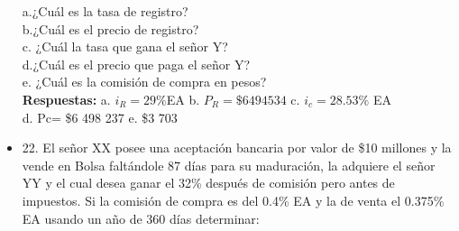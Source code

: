 \begin{itemize}
	a.¿Cuál es la tasa de registro?\\
	b.¿Cuál es el precio de registro?\\
	c. ¿Cuál la tasa que gana el señor Y?\\
	d.¿Cuál es el precio que paga el señor Y?\\
	e. ¿Cuál es la comisión de compra en pesos?\\
	\textbf{Respuestas:} a. $i_{R}= 29\%$EA\hspace{0,5cm} b. $P_{R} = \$6 494 534$\hspace{0,5cm}  c. $i_{c} = 28.53\%$ EA\hspace{0,5cm}\\
	d. Pc= \$6 498 237 \hspace{0,5cm} e. \$3 703\\
	\medskip
	\item 22. El señor XX posee una aceptación bancaria por valor de \$10 millones y la vende en Bolsa faltándole 87 días para su maduración, la adquiere el señor YY y el cual desea ganar el 32\% después de comisión pero antes de impuestos. Si la comisión de compra es del 0.4\% EA y la de venta el 0.375\% EA usando un año de 360 días determinar:\\
	

\end{itemize}
